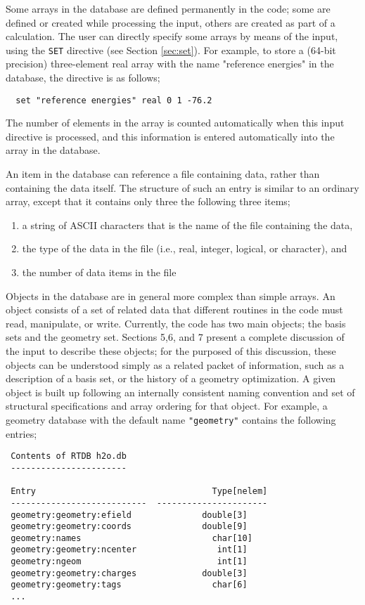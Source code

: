 Some arrays in the database are defined permanently in the code; some are
defined or created while processing the input, others are created as part
of a calculation.  The user can directly specify some arrays by means of
the input, using the \verb+SET+ directive (see Section \ref{sec:set}).  
For example, to store a (64-bit precision) three-element real array 
with the name "reference energies" in the database, the directive is 
as follows;

\begin{verbatim}
  set "reference energies" real 0 1 -76.2
\end{verbatim}

The number of elements in the array is counted automatically when this input
directive is processed, and this information is entered automatically
into the array in the database.

An item in the database can reference a file containing data, rather
than containing the data itself.  The structure of such an entry is 
similar to an ordinary array, except that it contains only three the following
three items;

\begin{enumerate}
\item a string of ASCII characters that is the name of the file containing
the data,
\item the type of the data in the file (i.e., real, integer, logical, 
or character), and 
\item the number of data items in the file
\end{enumerate}

Objects in the database are in general more complex than simple arrays.
An object consists of a set of related data that different routines in
the code must read, manipulate, or write.  Currently, the code has two
main objects; the basis sets and the geometry set.  Sections 5,6, and 7 
present a complete discussion of the input to describe these objects; for
the purposed of this discussion, these objects can be understood simply
as a related packet of information, such as a description of a
basis set, or the history of a geometry optimization.  A given object is
built up following an internally consistent naming convention and set of 
structural specifications and array ordering for that object. For example, 
a geometry
database with the default name \verb+"geometry"+ contains the following
entries;

\begin{verbatim}
 Contents of RTDB h2o.db
 -----------------------

 Entry                                   Type[nelem]
 ---------------------------  ----------------------
 geometry:geometry:efield              double[3]    
 geometry:geometry:coords              double[9]    
 geometry:names                          char[10]   
 geometry:geometry:ncenter                int[1]    
 geometry:ngeom                           int[1]    
 geometry:geometry:charges             double[3]    
 geometry:geometry:tags                  char[6]
 ...
\end{verbatim}


